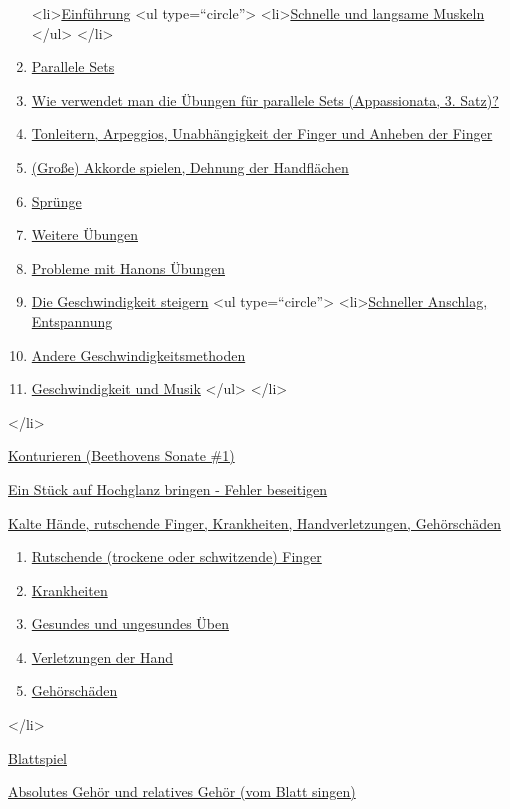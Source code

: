   \begin{enumerate}[label={\alph*.}] 
   <li>\hyperref[c1iii7a]{Einführung}
    <ul type=\enquote{circle}>
      <li>\hyperref[c1iii7aMuskeln]{Schnelle und langsame Muskeln}
    </ul>
   </li> 
   \item \hyperref[c1iii7b]{Parallele Sets}
   \item \hyperref[c1iii7c]{Wie verwendet man die Übungen für parallele Sets (Appassionata, 3. Satz)?}
   \item \hyperref[c1iii7d]{Tonleitern, Arpeggios, Unabhängigkeit der Finger und Anheben der Finger}
   \item \hyperref[c1iii7e]{(Große) Akkorde spielen, Dehnung der Handflächen}
   \item \hyperref[c1iii7f]{Sprünge}
   \item \hyperref[c1iii7g]{Weitere Übungen}
   \item \hyperref[c1iii7h]{Probleme mit Hanons Übungen}
   \item \hyperref[c1iii7i]{Die Geschwindigkeit steigern}
    <ul type=\enquote{circle}>
     <li>\hyperref[c1iii7iAnschlag]{Schneller Anschlag, Entspannung}
     \item \hyperref[c1iii7iAndere]{Andere Geschwindigkeitsmethoden}
     \item \hyperref[c1iii7iMusik]{Geschwindigkeit und Musik}
    </ul>
   </li>
   \end{enumerate}
 </li>
 \item \hyperref[c1iii8]{Konturieren (Beethovens Sonate \#1)}
 \item \hyperref[c1iii9]{Ein Stück auf Hochglanz bringen - Fehler beseitigen}
 \item \hyperref[c1iii10]{Kalte Hände, rutschende Finger, Krankheiten, Handverletzungen, Gehörschäden}
  \begin{enumerate}[label={\alph*.}] 
   <li>\hyperref[c1iii10]{Kalte Hände}
   \item \hyperref[c1iii10rutschen]{Rutschende (trockene oder schwitzende) Finger}
   \item \hyperref[c1iii10krank]{Krankheiten}
   \item \hyperref[c1iii10ungesund]{Gesundes und ungesundes Üben}
   \item \hyperref[c1iii10hand]{Verletzungen der Hand}
   \item \hyperref[c1iii10gehoer]{Gehörschäden}
   \end{enumerate}
 </li>
 \item \hyperref[c1iii11]{Blattspiel}
 \item \hyperref[c1iii12]{Absolutes Gehör und relatives Gehör (vom Blatt singen)}

